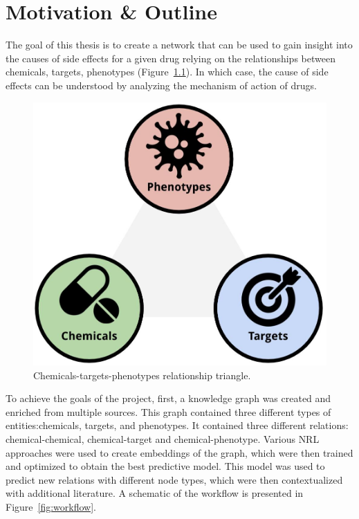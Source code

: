 \chapter{Motivation \& Outline}\label{motivation}

The goal of this thesis is to create a network that can be used to gain insight into the causes of side effects for a given drug relying on the relationships between chemicals, targets, phenotypes (Figure~\ref{fig:triangle}).
In which case, the cause of side effects can be understood by analyzing the mechanism of action of drugs.

\begin{figure}[!ht]
    \centering
    \includegraphics[scale=0.175]
    {figures/triangle.jpg}
    \captionsetup{justification=centering}
    \caption{\label{fig:triangle} Chemicals-targets-phenotypes relationship triangle.}
\end{figure}

To achieve the goals of the project, first, a knowledge graph was created and enriched from multiple sources.
This graph contained three different types of entities:chemicals, targets, and phenotypes.
It contained three different relations: chemical-chemical, chemical-target and chemical-phenotype.
Various \ac{NRL} approaches were used to create embeddings of the graph, which were then trained and optimized to obtain the best predictive model.
This model was used to predict new relations with different node types, which were then contextualized with additional literature.
A schematic of the workflow is presented in Figure~\ref{fig:workflow}.

